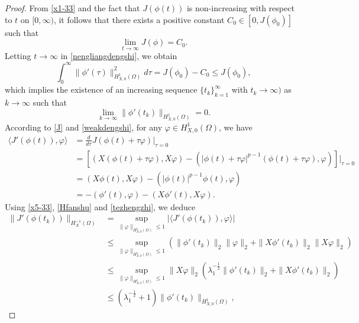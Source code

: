 \documentclass[10pt,a4paper]{amsart}
\begin{document}
\begin{proof}
From \eqref{x1-33} and the fact that $J(\phi(t))$ is non-increasing with respect to $t$ on $[0,\infty)$, it follows that there exists a positive constant $C_0\in[0,J(\phi_0)]$ such that
\begin{equation}\label{x2-33}
\lim\limits_{t\rightarrow\infty}J(\phi)=C_0.
\end{equation}
Letting $t\rightarrow\infty$ in \eqref{nengliangdengshi}, we obtain
\begin{equation}\label{x3-33}
\int_0^\infty\|\phi'(\tau)\|_{H_{X,0}^1(\Omega)}^2d\tau=J(\phi_0)-C_0\leq J(\phi_0),
\end{equation}
which implies the existence of an increasing sequence $\{t_k\}_{k=1}^\infty$ with $t_k\rightarrow\infty)$ as $k\rightarrow\infty$ such that
\begin{equation}\label{x4-33}
\lim_{k\rightarrow\infty}\|\phi'(t_k)\|_{H_{X,0}^1(\Omega)}=0.
\end{equation}
According to \eqref{J} and \eqref{weakdengshi}, for any $\varphi\in H_{X,0}^1(\Omega)$, we have
\begin{equation}\label{x5-33}
\begin{split}
\langle J'(\phi(t)),\varphi\rangle&=\frac{d}{d\tau}J(\phi(t)+\tau\varphi)\bigg|_{\tau=0}\\
&=\left[\left(X(\phi(t)+\tau\varphi),X\varphi\right)-\left(|\phi(t)+\tau\varphi|^{p-1}(\phi(t)+\tau\varphi),\varphi\right)\right]\big|_{\tau=0}\\
&=(X\phi(t),X\varphi)-\left(|\phi(t)|^{p-1}\phi(t),\varphi\right)\\
&=-(\phi'(t),\varphi)-(X\phi'(t),X\varphi).
\end{split}
\end{equation}
Using \eqref{x5-33}, \eqref{Hfanshu} and \eqref{tezhengzhi}, we deduce
\begin{equation*}
\begin{split}
\|J'(\phi(t_k))\|_{H_X^{-1}(\Omega)}&=\sup_{\|\varphi\|_{H_{X,0}^1(\Omega)}\leq1}\big|\langle J'(\phi(t_k)),\varphi\rangle\big|\\
&\leq\sup_{\|\varphi\|_{H_{X,0}^1(\Omega)}\leq1}\left(\|\phi'(t_k)\|_2\|\varphi\|_2+\|X\phi'(t_k)\|_2\|X\varphi\|_2\right)\\
&\leq\sup_{\|\varphi\|_{H_{X,0}^1(\Omega)}\leq1}\|X\varphi\|_2\left(\lambda_1^{-\frac{1}{2}}\|\phi'(t_k)\|_2+\|X\phi'(t_k)\|_2\right)\\
&\leq\left(\lambda_1^{-\frac{1}{2}}+1\right)\|\phi'(t_k)\|_{H_{X,0}^1(\Omega)},
\end{split}
\end{equation*}

\end{proof}
\end{document}

